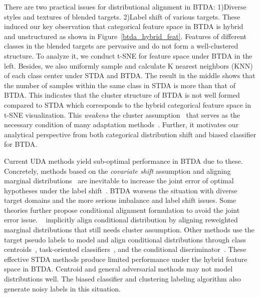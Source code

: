 \documentclass[letterpaper]{article} \usepackage{aaai23}  \usepackage{times}  \usepackage{helvet}  \usepackage{courier}  \usepackage[hyphens]{url}  \usepackage{graphicx} \urlstyle{rm} \def\UrlFont{\rm}  \usepackage{natbib}  \usepackage{caption} \frenchspacing  \setlength{\pdfpagewidth}{8.5in}  \setlength{\pdfpageheight}{11in}
\begin{document}
There are two practical issues for distributional alignment in BTDA: 1)Diverse styles and textures of blended targets. 2)Label shift of various targets. These induced our key observation that categorical feature space in BTDA is hybrid and unstructured as shown in Figure~\ref{btda_hybrid_feat}. Features of different classes in the blended targets are pervasive and do not form a well-clustered structure. To analyze it, we conduct t-SNE for feature space under BTDA in the left. Besides, we also uniformly sample and calculate K nearest neighbors (KNN) of each class center under STDA and BTDA. The result in the middle shows that the number of samples within the same class in STDA is more than that of BTDA. This indicates that the cluster structure of BTDA is not well formed compared to STDA which corresponds to the hybrid categorical feature space in t-SNE visualization.
This \textit{weakens} the cluster assumption~\cite{chapelle2005semi} that serves as the necessary condition of many adaptation methods~\cite{tachet2020domain,shu2018dirt,tang2020unsupervised,yang2021exploiting}. Further, it motivates our analytical perspective from both categorical distribution shift and biased classifier for BTDA.


Current UDA methods yield sub-optimal performance in BTDA due to these. Concretely, methods based on the \textit{covariate shift} assumption and aligning marginal distributions~\cite{tzeng2017adversarial,ganin2015unsupervised,shen2018wasserstein} are inevitable to increase the joint error of optimal hypotheses under the label shift~\cite{wu2019domain,tachet2020domain}. BTDA worsens the situation with diverse target domains and the more serious imbalance and label shift issues. Some theories further propose conditional alignment formulation to avoid the joint error issue. ~\cite{tachet2020domain,jiang2020implicit} implicitly align conditional distribution by aligning reweighted marginal distributions that still needs cluster assumption. Other methods use the target pseudo labels to model and align conditional distributions through class centroids~\cite{pan2019transferrable,tanwisuth2021prototype,singh2021clda}, task-oriented classifiers~\cite{zhang2019bridging,saito2019semi}, and the conditional discriminator~\cite{long2018conditional}. These effective STDA methods produce limited performance under the hybrid feature space in BTDA. Centroid and general adversarial methods may not model distributions well. The biased classifier and clustering labeling algorithm also generate noisy labels in this situation.
\end{document}
